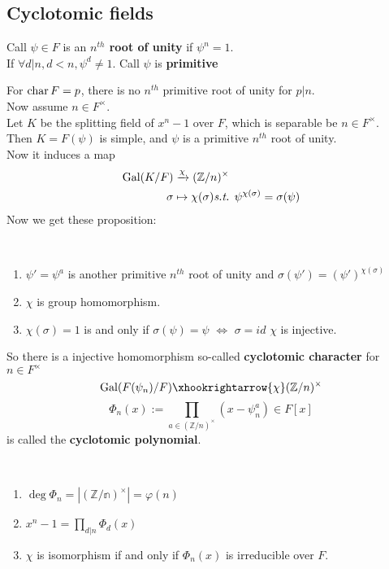  \subsection{Cyclotomic fields}
 \begin{definition}
    Call  $ \psi\in F  $ is an  \textbf{$ n^{th } $ root of unity} if  $ \psi^n=1 $. \\
    If  $ \forall d|n,d<n, \psi^d\not=1 $. Call  $ \psi  $ is \textbf{primitive} 
 \end{definition}
 For  $ \operatorname{char} F=p  $, there is no  $ n^{th} $ primitive root of unity for  $ p|n $.\\
 Now assume  $ n\in F^{\times} $.\\
 Let  $ K  $ be the splitting field of  $ x^n-1 $ over  $ F  $, which is separable be  $ n\in F^{\times} $.\\
 Then  $ K=F(\psi ) $ is simple, and  $ \psi   $ is a primitive  $ n^{th } $ root of unity.\\
 Now it induces a map
 \begin{align*}
    \operatorname{Gal}(K/F)&\xrightarrow{\chi}(\mathbb{Z}/n)^\times\\
    \sigma&\mapsto \chi(\sigma)\emph{s.t. }   \psi^{\chi(\sigma)}=\sigma(\psi) 
 \end{align*}
 Now we get these proposition:
 \begin{proposition}
    \,\begin{enumerate}[(1)]
        \item  $ \psi'=\psi^a $ is another primitive  $ n^{th} $ root of unity and  $ \sigma(\psi')=(\psi')^{\chi(\sigma)} $
        \item $  \chi $ is group homomorphism.
        \item  $ \chi(\sigma)=1  $ is and only if  $ \sigma(\psi)=\psi  $ $ \Leftrightarrow  $  $ \sigma=id $  \ie  $ \chi $ is injective.  
    \end{enumerate}
 \end{proposition}
 So there is a injective homomorphism so-called \textbf{cyclotomic character} for  $ n\in F^\times $
 \[\Gal(F(\psi_n)/F)\xhookrightarrow{\chi}(\mathbb{Z}/n)^\times\] 
 \[\Phi_n(x):=\prod\limits_{a\in(\mathbb{Z}/n)^\times}(x-\psi_n^a)\in F[x]\] is called the \textbf{cyclotomic polynomial}.\\
 \begin{proposition}
    \,
    \begin{enumerate}[(1)]
        \item  $ \deg \Phi_n=|(\mathbb{Z/n})^\times|=\varphi(n) $
        \item  $ x^n-1=\prod\limits_{d|n}\Phi_d(x) $  
        \item  $ \chi  $ is isomorphism if and only if  $ \Phi_n(x)  $ is irreducible over  $ F  $.
    \end{enumerate}
 \end{proposition}

